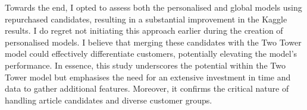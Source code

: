 \documentclass[conference,compsoc]{IEEEtran}
\begin{document}
Towards the end, I opted to assess both the personalised and global models using repurchased candidates, resulting in a substantial improvement in the Kaggle results. I do regret not initiating this approach earlier during the creation of personalised models. I believe that merging these candidates with the Two Tower model could effectively differentiate customers, potentially elevating the model's performance. In essence, this study underscores the potential within the Two Tower model but emphasises the need for an extensive investment in time and data to gather additional features. Moreover, it confirms the critical nature of handling article candidates and diverse customer groups.



%
%



%
%
\end{document}
